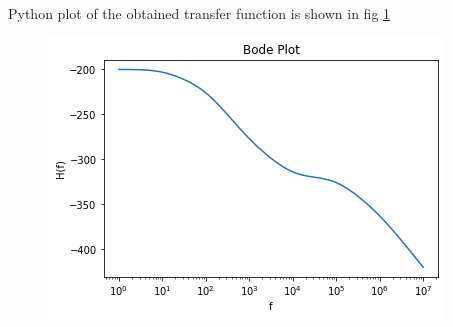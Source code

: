 \\ 
\\ \\
Python plot of the obtained transfer function is shown in fig \ref{fig:bode}
\begin{figure}[htp]
    \centering
    \includegraphics[width=\columnwidth]{./figs/ee18btech11001/ee18btech11001_2.png}
    \caption{}
    \label{fig:bode}
\end{figure}
